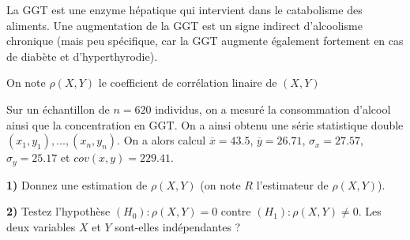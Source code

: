 \documentclass{article}
\numberwithin{equation}{section}
\begin{document}
La GGT est une enzyme hépatique qui intervient dans le catabolisme des aliments. Une augmentation de la GGT est un 
signe indirect d'alcoolisme chronique (mais peu spécifique, car la GGT augmente également fortement en cas 
de diabète et d'hyperthyrodie).

On  note $\rho(X,Y)$ le coefficient de corrélation linaire de $(X,Y)$

Sur un échantillon de $n=620$ individus, on a mesuré la consommation d'alcool ainsi que la concentration en GGT.
On a ainsi obtenu une série statistique double $(x_1,y_1),\hdots, (x_n,y_n)$. On a alors calcul
$\overline{x}=43.5$, $\overline{y}=26.71$, $\sigma_x=27.57$, $\sigma_y=25.17$ et $cov(x,y)=229.41$.

{\bf 1)} Donnez une estimation de $\rho(X,Y)$ (on note $R$ l'estimateur de $\rho(X,Y)$).

{\bf 2)} Testez l'hypothèse $(H_0) : \rho(X,Y)=0$ contre $(H_1) : \rho(X,Y)\neq 0$. Les deux variables $X$ et $Y$
sont-elles indépendantes ?

\fi

\fi
\end{document}
